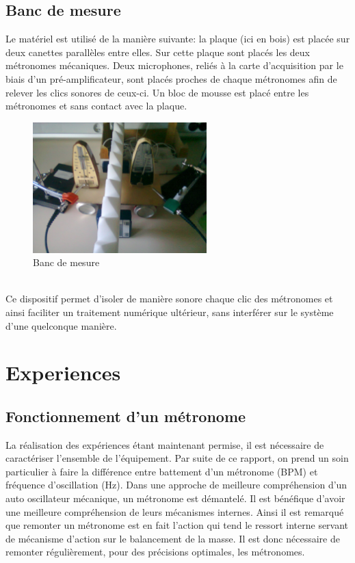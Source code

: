 \documentclass[a4paper,11pt]{report}
\begin{document}
\section{Banc de mesure}

Le matériel est utilisé de la manière suivante: la plaque (ici en bois) est placée sur deux canettes parallèles entre elles. Sur cette plaque sont placés les deux métronomes mécaniques. Deux microphones, reliés à la carte d'acquisition par le biais d'un pré-amplificateur, sont placés proches de chaque métronomes afin de relever les clics sonores de ceux-ci. Un bloc de mousse est placé entre les métronomes et sans contact avec la plaque.\\
\begin{figure}[h]
\centering
\includegraphics[width=0.6\textwidth]{BancMesure}
\caption{Banc de mesure}\label{Banc}
\end{figure}\\
Ce dispositif permet d'isoler de manière sonore chaque clic des métronomes et ainsi faciliter un traitement numérique ultérieur, sans interférer sur le système d'une quelconque manière.
\chapter{Experiences}
\section{Fonctionnement d'un métronome}
La réalisation des expériences étant maintenant permise, il est nécessaire de caractériser  l'ensemble de l'équipement. Par suite de ce rapport, on prend un soin particulier à faire la différence entre battement d'un métronome (BPM) et fréquence d'oscillation (Hz). Dans une approche de meilleure compréhension d'un auto oscillateur mécanique, un métronome est  démantelé. Il est bénéfique d'avoir une meilleure compréhension de leurs mécanismes internes. Ainsi il est remarqué que remonter un métronome est en fait l'action qui tend le ressort interne servant de mécanisme d'action sur le balancement de la masse. Il est donc nécessaire de remonter régulièrement, pour des précisions optimales, les métronomes. \\
\end{document}
